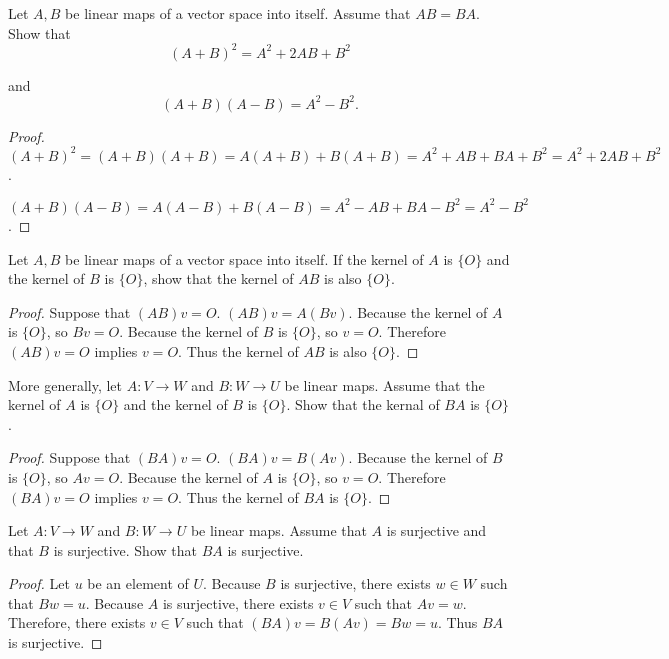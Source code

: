 \begin{exercise}
    Let $A, B$ be linear maps of a vector space into itself. Assume that $AB = BA$. Show that
    \[
        {(A + B)}^{2} = A^{2} + 2AB + B^{2}
    \]

    and
    \[
        (A + B)(A - B) = A^{2} - B^{2}.
    \]
\end{exercise}

\begin{proof}
    ${(A + B)}^{2} = (A + B)(A + B) = A(A + B) + B(A + B) = A^{2} + AB + BA + B^{2} = A^{2} + 2AB + B^{2}$.

    $(A + B)(A - B) = A(A - B) + B(A - B) = A^{2} - AB + BA - B^{2} = A^{2} - B^{2}$.
\end{proof}

\begin{exercise}
    Let $A, B$ be linear maps of a vector space into itself. If the kernel of $A$ is $\{ O \}$ and the kernel of $B$ is $\{ O \}$, show that the kernel of $AB$ is also $\{ O \}$.
\end{exercise}

\begin{proof}
    Suppose that $(AB)v = O$. $(AB)v = A(Bv)$. Because the kernel of $A$ is $\{ O \}$, so $Bv = O$. Because the kernel of $B$ is $\{ O \}$, so $v = O$. Therefore $(AB)v = O$ implies $v = O$. Thus the kernel of $AB$ is also $\{ O \}$.
\end{proof}

\begin{exercise}
    More generally, let $A: V\to W$ and $B: W\to U$ be linear maps. Assume that the kernel of $A$ is $\{ O \}$ and the kernel of $B$ is $\{ O \}$. Show that the kernal of $BA$ is $\{ O \}$.
\end{exercise}

\begin{proof}
    Suppose that $(BA)v = O$. $(BA)v = B(Av)$. Because the kernel of $B$ is $\{ O \}$, so $Av = O$. Because the kernel of $A$ is $\{ O \}$, so $v = O$. Therefore $(BA)v = O$ implies $v = O$. Thus the kernel of $BA$ is $\{ O \}$.
\end{proof}

\begin{exercise}
    Let $A: V \to W$ and $B: W \to U$ be linear maps. Assume that $A$ is surjective and that $B$ is surjective. Show that $BA$ is surjective.
\end{exercise}

\begin{proof}
    Let $u$ be an element of $U$. Because $B$ is surjective, there exists $w\in W$ such that $Bw = u$. Because $A$ is surjective, there exists $v\in V$ such that $Av = w$. Therefore, there exists $v\in V$ such that $(BA)v = B(Av) = Bw = u$. Thus $BA$ is surjective.
\end{proof}

